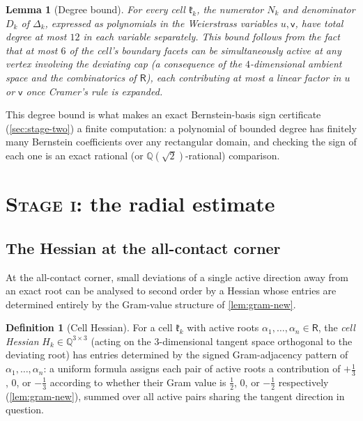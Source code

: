\documentclass[11pt,reqno]{amsart}
\renewcommand{\_}{\origunderscore\allowbreak}
\numberwithin{equation}{section}
\theoremstyle{plain}
\newtheorem{lem}[thm]{Lemma}
\theoremstyle{definition}
\newtheorem{definition}[thm]{Definition}
\theoremstyle{remark}
\newcommand{\Rt}{\mathsf{R}}                 %
\newcommand{\Cell}[1]{\mathfrak{k}_{#1}}     %
\newcommand{\defect}{\Delta}                 %
\newcommand{\base}{u}                        %
\newcommand{\stageone}{\textnormal{\scshape Stage i}}
\begin{document}
\begin{lem}[Degree bound]\label{lem:degree-bound-new}
For every cell $\Cell{k}$, the numerator $N_k$ and denominator $D_k$ of
$\defect_k$, expressed as polynomials in the Weierstrass variables
$\base,\mathsf v$, have total degree at most $12$ in each variable
separately. This bound follows from the fact that at most $6$ of the
cell's boundary facets can be simultaneously active at any vertex
involving the deviating cap (a consequence of the $4$-dimensional
ambient space and the combinatorics of $\Rt$), each contributing at
most a linear factor in $\base$ or $\mathsf v$ once Cramer's rule is
expanded.
\end{lem}

This degree bound is what makes an exact Bernstein-basis sign
certificate (\cref{sec:stage-two}) a finite computation: a polynomial
of bounded degree has finitely many Bernstein coefficients over any
rectangular domain, and checking the sign of each one is an exact
rational (or $\mathbb{Q}(\sqrt2)$-rational) comparison.
\section{\stageone: the radial estimate}\label{sec:stage-one}

\subsection{The Hessian at the all-contact corner}\label{sec:hessian-def-new}

At the all-contact corner, small deviations of a single active
direction away from an exact root can be analysed to second order by a
Hessian whose entries are determined entirely by the Gram-value
structure of \cref{lem:gram-new}.

\begin{definition}[Cell Hessian]\label{def:hessian-new}
For a cell $\Cell{k}$ with active roots $\alpha_1,\dots,\alpha_n\in\Rt$,
the \emph{cell Hessian} $H_k\in\mathbb{Q}^{3\times3}$ (acting on the
$3$-dimensional tangent space orthogonal to the deviating root) has
entries determined by the signed Gram-adjacency pattern of
$\alpha_1,\dots,\alpha_n$: a uniform formula assigns each pair of
active roots a contribution of $+\tfrac13$, $0$, or $-\tfrac13$
according to whether their Gram value is $\tfrac12$, $0$, or $-\tfrac12$
respectively (\cref{lem:gram-new}), summed over all active pairs
sharing the tangent direction in question.
\end{definition}
\end{document}
